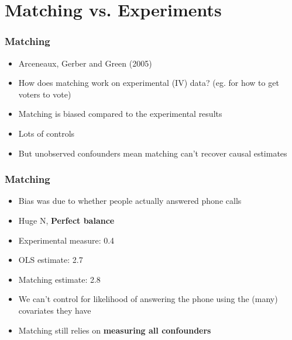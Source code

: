 \documentclass[xcolor=x11names,compress]{beamer}\usepackage[]{graphicx}\usepackage[]{color}
\renewcommand{\(}{\begin{columns}}
\renewcommand{\)}{\end{columns}}
\newcommand{\<}[1]{\begin{column}{#1}}
\renewcommand{\>}{\end{column}}
\begin{document}
\section{Matching vs. Experiments}

\begin{frame}
\frametitle{Matching}
\begin{itemize}
\item Arceneaux, Gerber and Green (2005)
\pause
\item How does matching work on experimental (IV) data? (eg. for how to get voters to vote)
\pause
\item Matching is biased compared to the experimental results
\pause
\item Lots of controls 
\pause
\item But unobserved confounders mean matching can't recover causal estimates
\end{itemize}
\end{frame}

\begin{frame}
\frametitle{Matching}
\begin{itemize}
\item Bias was due to whether people actually answered phone calls
\pause
\item Huge N, \textbf{Perfect balance}
\pause
\item Experimental measure: 0.4
\pause
\item OLS estimate: 2.7
\pause
\item Matching estimate: 2.8
\pause
\item We can't control for likelihood of answering the phone using the (many) covariates they have
\pause
\item Matching still relies on \textbf{measuring all confounders}
\end{itemize}
\end{frame}
\end{document}
